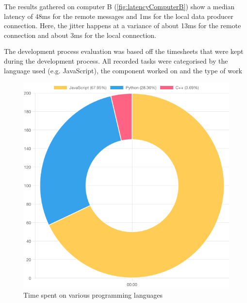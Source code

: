 The results gathered on computer B (\ref{fig:latencyComputerB}) show a median latency of 48ms for the remote messages and 1ms for the local data producer connection.
Here, the jitter happens at a variance of about 13ms for the remote connection and about 3ms for the local connection.

The development process evaluation was based off the timesheets that were kept during the development process. All recorded tasks were categorised by the language used (e.g. JavaScript), the component worked on and the type of work

\begin{figure}[h]
\centering
\includegraphics[scale=0.5]{04_Artefakte/01_Abbildungen/time-spent-on-languages}
\caption[Time spent on languages]{Time spent on various programming languages\protect}
\label{fig:timeSpentLanguages}
\end{figure}

